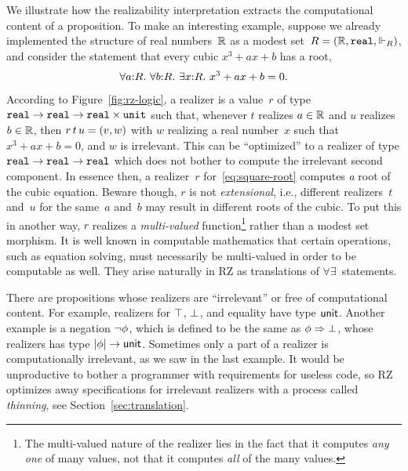We illustrate how the realizability interpretation extracts the
computational content of a proposition. To make an interesting
example, suppose we already implemented the structure of real
numbers~$\mathbb{R}$ as a modest set~$R = (\mathbb{R}, \mathtt{real}, {\Vdash_R})$, and
consider the statement that every cubic $x^3 + a x + b$ has a root,
%
\begin{equation}
  \label{eq:square-root}%
  \iforall{a}{R}{\iforall{b}{R}{\iexists{x}{R}{\iequal{x^3 + a x + b}{0}}}}.
\end{equation}
%
According to Figure~\ref{fig:rz-logic}, a realizer is a value~$r$ of
type
$\mathtt{real} \to \mathtt{real} \to \mathtt{real} \times \mathtt{unit}$
such that, whenever $t$ realizes $a \in \mathbb{R}$ and $u$ realizes $b \in
\mathbb{R}$, then $r\,t\,u = (v, w)$ with $w$ realizing a real
number~$x$ such that $x^3 + a x + b = 0$, and $w$ is irrelevant. This
can be ``optimized'' to a realizer of type
$\mathtt{real} \to \mathtt{real} \to \mathtt{real}$ which
does not bother to compute the irrelevant second component. In essence
then, a realizer~$r$ for~\eqref{eq:square-root} computes \emph{a} root
of the cubic equation. Beware though, $r$ is not \emph{extensional},
i.e., different realizers~$t$ and~$u$ for the same~$a$ and~$b$ may
result in different roots of the cubic. To put this in another way,
$r$ realizes a \emph{multi-valued} function\footnote{The multi-valued
  nature of the realizer lies in the fact that it computes \emph{any
    one} of many values, not that it computes \emph{all} of the many
  values.} rather than a modest set morphism. It is well known in
computable mathematics that certain operations, such as equation
solving, must necessarily be multi-valued in order to be computable as
well. They arise naturally in RZ as translations of
$\forall\exists$~statements.

There are propositions whose realizers are ``irrelevant'' or free of
computational content. For example, realizers for $\top$, $\bot$,
and equality have type $\mathsf{unit}$. Another example is a negation
$\lnot \phi$, which is defined to be the same as
$\phi\Rightarrow \bot$, whose realizers has type
$|\phi| \to \mathsf{unit}$. Sometimes only a part of a realizer
is computationally irrelevant, as we saw in the last example. It would
be unproductive to bother a programmer with requirements for useless
code, so RZ optimizes away specifications for irrelevant realizers
with a process called \emph{thinning}, see Section~\ref{sec:translation}.


